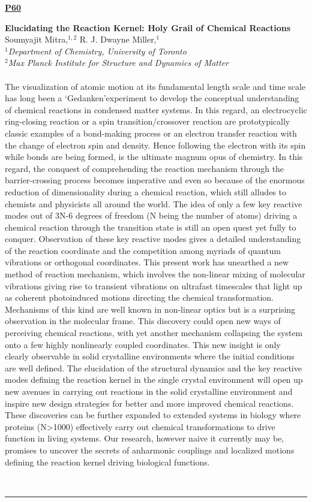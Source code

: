 \documentclass[titlepage,oneside,openany,10pt]{book}
\newenvironment{posterabs}[4] %
        {
	\begin{flushright}
                \underline{\textbf{#4}}
        \end{flushright}
        \textbf{#1}\\%
        #2\\%
        \textit{#3}\\\\%
        }
        {
        \\
        \noindent\rule{15cm}{0.5pt}%
        }
\begin{document}
\begin{posterabs}
    {Elucidating the Reaction Kernel: Holy Grail of Chemical Reactions}
    {Soumyajit Mitra,$^{1,2}$ R. J. Dwayne Miller,$^{1}$}
    {
    $^1$Department of Chemistry, University of Toronto\\
    $^2$Max Planck Institute for Structure and Dynamics of Matter
    }
    {P60}
    The visualization of atomic motion at its fundamental length scale and time scale has long been a `Gedanken'experiment to develop the conceptual understanding of chemical reactions in condensed matter systems. In this regard, an electrocyclic ring-closing reaction or a spin transition/crossover reaction are prototypically classic examples of a bond-making process or an electron transfer reaction with the change of electron spin and density. Hence following the electron with its spin while bonds are being formed, is the ultimate magnum opus of chemistry. In this regard, the conquest of comprehending the reaction mechanism through the barrier-crossing process becomes imperative and even so because of the enormous reduction of dimensionality during a chemical reaction, which still alludes to chemists and physicists all around the world. The idea of only a few key reactive modes out of 3N-6 degrees of freedom (N being the number of atoms) driving a chemical reaction through the transition state is still an open quest yet fully to conquer. Observation of these key reactive modes gives a detailed understanding of the reaction coordinate and the competition among myriads of quantum vibrations or orthogonal coordinates. This present work has unearthed a new method of reaction mechanism, which involves the non-linear mixing of molecular vibrations giving rise to transient vibrations on ultrafast timescales that light up as coherent photoinduced motions directing the chemical transformation. Mechanisms of this kind are well known in non-linear optics but is a surprising observation in the molecular frame. This discovery could open new ways of perceiving chemical reactions, with yet another mechanism collapsing the system onto a few highly nonlinearly coupled coordinates. This new insight is only clearly observable in solid crystalline environments where the initial conditions are well defined. The elucidation of the structural dynamics and the key reactive modes defining the reaction kernel in the single crystal environment will open up new avenues in carrying out reactions in the solid crystalline environment and inspire new design strategies for better and more improved chemical reactions. These discoveries can be further expanded to extended systems in biology where proteins (N\textgreater{}1000) effectively carry out chemical transformations to drive function in living systems. Our research, however naive it currently may be, promises to uncover the secrets of anharmonic couplings and localized motions defining the reaction kernel driving biological functions.
    \label{MitraS}
\end{posterabs}
\end{document}
